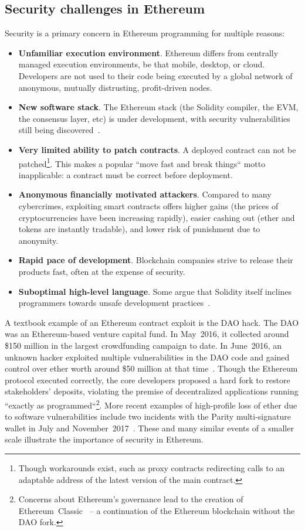 \subsection{Security challenges in Ethereum} \label{SecurityChallenges}

Security is a primary concern in Ethereum programming for multiple reasons:
\begin{itemize}
	\item \textbf{Unfamiliar execution environment}.
	Ethereum differs from centrally managed execution environments, be that mobile, desktop, or cloud.
	Developers are not used to their code being executed by a global network of anonymous, mutually distrusting, profit-driven nodes.
	\item \textbf{New software stack}.
	The Ethereum stack (the Solidity compiler, the EVM, the consensus layer, etc) is under development, with security vulnerabilities still being discovered~\cite{chriseth2017}.
	\item \textbf{Very limited ability to patch contracts}.
	A deployed contract can not be patched\footnote{Though workarounds exist, such as proxy contracts redirecting calls to an adaptable address of the latest version of the main contract.}.
	This makes a popular ``move fast and break things`` motto inapplicable: a contract must be correct before deployment.
	\item \textbf{Anonymous financially motivated attackers}.
	Compared to many cybercrimes, exploiting smart contracts offers higher gains (the prices of cryptocurrencies have been increasing rapidly), easier cashing out (ether and tokens are instantly tradable), and lower risk of punishment due to anonymity.
	\item \textbf{Rapid pace of development}.
	Blockchain companies strive to release their products fast, often at the expense of security.
	\item \textbf{Suboptimal high-level language}.
	Some argue that Solidity itself inclines programmers towards unsafe development practices~\cite{ydtm2016}.
\end{itemize}

A textbook example of an Ethereum contract exploit is the DAO hack.
The DAO was an Ethereum-based venture capital fund.
In May~2016, it collected around \$150 million in the largest crowdfunding campaign to date.
In June~2016, an unknown hacker exploited multiple vulnerabilities in the DAO code and gained control over ether worth around \$50 million at that time~\cite{Sirer2016}.
Though the Ethereum protocol executed correctly, the core developers proposed a hard fork to restore stakeholders' deposits, violating the premise of decentralized applications running ``exactly as programmed``\footnote{Concerns about Ethereum's governance lead to the creation of Ethereum~Classic~\cite{EthereumClassic} -- a continuation of the Ethereum blockchain without the DAO fork.}.
More recent examples of high-profile loss of ether due to software vulnerabilities include two incidents with the Parity multi-signature wallet in July and November~2017~\cite{Palladino2017}.
These and many similar events of a smaller scale illustrate the importance of security in Ethereum.

